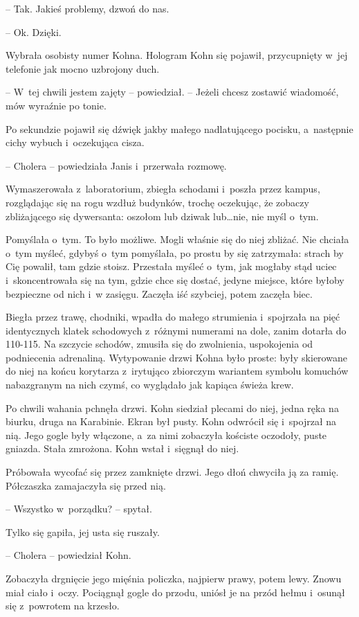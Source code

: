 \documentclass[oneside,polish,11pt,sfheadings]{mwbk}
\begin{document}
-- Tak. Jakieś problemy, dzwoń do nas.

-- Ok. Dzięki.

Wybrała osobisty numer Kohna. Hologram Kohn się pojawił, przycupnięty w~jej telefonie jak mocno uzbrojony duch.

-- W~tej chwili jestem zajęty -- powiedział. -- Jeżeli chcesz zostawić
wiadomość, mów wyraźnie po tonie.

Po sekundzie pojawił się dźwięk jakby małego nadlatującego pocisku, a~następnie cichy wybuch i~oczekująca cisza.

-- Cholera -- powiedziała Janis i~przerwała rozmowę.

Wymaszerowała z~laboratorium, zbiegła schodami i~poszła przez kampus,
rozglądając się na rogu wzdłuż budynków, trochę oczekując, że zobaczy
zbliżającego się dywersanta: oszołom lub dziwak lub\ldots nie, nie myśl o~tym.

Pomyślała o~tym. To było możliwe. Mogli właśnie się do niej zbliżać. Nie
chciała o~tym myśleć, gdybyś o~tym pomyślała, po prostu by się
zatrzymała: strach by Cię powalił, tam gdzie stoisz. Przestała myśleć o~tym, jak mogłaby stąd uciec i~skoncentrowała się na tym, gdzie chce się
dostać, jedyne miejsce, które byłoby bezpieczne od nich i~w zasięgu.
Zaczęła iść szybciej, potem zaczęła biec.

Biegła przez trawę, chodniki, wpadła do małego strumienia i~spojrzała na
pięć identycznych klatek schodowych z~różnymi numerami na dole, zanim
dotarła do 110-115. Na szczycie schodów, zmusiła się do zwolnienia,
uspokojenia od podniecenia adrenaliną. Wytypowanie drzwi Kohna było
proste: były skierowane do niej na końcu korytarza z~irytująco zbiorczym
wariantem symbolu komuchów nabazgranym na nich czymś, co wyglądało jak
kapiąca świeża krew.

Po chwili wahania pchnęła drzwi. Kohn siedział plecami do niej, jedna
ręka na biurku, druga na Karabinie. Ekran był pusty. Kohn odwrócił się i~spojrzał na nią. Jego gogle były włączone, a~za nimi zobaczyła kościste
oczodoły, puste gniazda. Stała zmrożona. Kohn wstał i~sięgnął do niej.

Próbowała wycofać się przez zamknięte drzwi. Jego dłoń chwyciła ją za
ramię. Półczaszka zamajaczyła się przed nią.

-- Wszystko w~porządku? -- spytał.

Tylko się gapiła, jej usta się ruszały.

-- Cholera -- powiedział Kohn.

Zobaczyła drgnięcie jego mięśnia policzka, najpierw prawy, potem lewy.
Znowu miał ciało i~oczy. Pociągnął gogle do przodu, uniósł je na przód
hełmu i~osunął się z~powrotem na krzesło.
\end{document}
